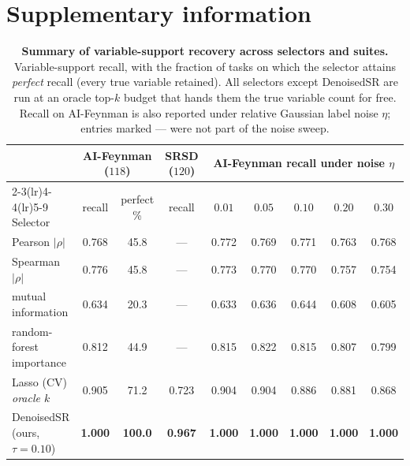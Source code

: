 \documentclass[11pt]{article}
\begin{document}
\clearpage
\appendix
\section*{Supplementary information}

\begin{table}[h!]\centering
\caption{\textbf{Summary of variable-support recovery across selectors and
suites.} Variable-support recall, with the fraction of tasks on which the
selector attains \emph{perfect} recall (every true variable retained). All
selectors except DenoisedSR are run at an oracle top-$k$ budget that hands them
the true variable count for free. Recall on AI-Feynman is also reported under
relative Gaussian label noise $\eta$; entries marked --- were not part of the
noise sweep.}
\label{tab:selector-summary}
\footnotesize
\begin{tabular}{lcccccccc}
\toprule
& \multicolumn{2}{c}{AI-Feynman ($118$)} & SRSD ($120$) & \multicolumn{5}{c}{AI-Feynman recall under noise $\eta$} \\
\cmidrule(lr){2-3}\cmidrule(lr){4-4}\cmidrule(lr){5-9}
Selector & recall & perfect \% & recall & $0.01$ & $0.05$ & $0.10$ & $0.20$ & $0.30$ \\
\midrule
Pearson $|\rho|$           & 0.768 & 45.8 & ---   & 0.772 & 0.769 & 0.771 & 0.763 & 0.768 \\
Spearman $|\rho|$          & 0.776 & 45.8 & ---   & 0.773 & 0.770 & 0.770 & 0.757 & 0.754 \\
mutual information         & 0.634 & 20.3 & ---   & 0.633 & 0.636 & 0.644 & 0.608 & 0.605 \\
random-forest importance   & 0.812 & 44.9 & ---   & 0.815 & 0.822 & 0.815 & 0.807 & 0.799 \\
Lasso (CV) \emph{oracle $k$} & 0.905 & 71.2 & 0.723 & 0.904 & 0.904 & 0.886 & 0.881 & 0.868 \\
\midrule
DenoisedSR (ours, $\tau{=}0.10$) & \textbf{1.000} & \textbf{100.0} & \textbf{0.967} & \textbf{1.000} & \textbf{1.000} & \textbf{1.000} & \textbf{1.000} & \textbf{1.000} \\
\bottomrule
\end{tabular}
\end{table}
\end{document}
